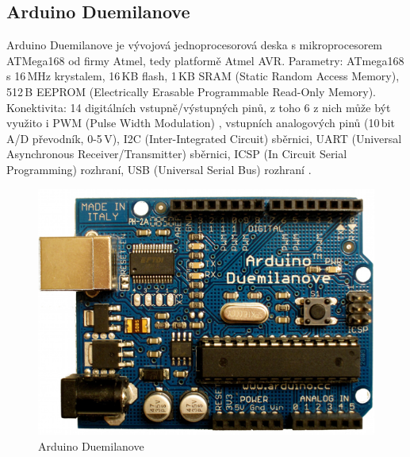 		\subsection{Arduino Duemilanove} Arduino Duemilanove je vývojová jednoprocesorová deska s mikroprocesorem ATMega168 od firmy Atmel, tedy platformě Atmel AVR. 
		Parametry: ATmega168 s 16\,MHz krystalem, 16\,KB flash, 1\,KB SRAM (Static Random Access Memory), 512\,B EEPROM (Electrically Erasable Programmable Read-Only Memory). 	Konektivita: 14 digitálních vstupně/výstupných pinů, z toho 6 z nich může být využito i PWM (Pulse Width Modulation) , vstupních analogových pinů (10\,bit A/D převodník, 0-5\,V), I2C (Inter-Integrated Circuit) sběrnici, UART (Universal Asynchronous Receiver/Transmitter) sběrnici, ICSP (In Circuit Serial Programming) rozhraní, USB (Universal Serial Bus) rozhraní \cite{ArduinoDuemilanove}.	
			\begin{figure}[!h]
  \begin{center}
    \includegraphics[scale=0.2]{obrazky/emded_arduino_duemilanove}
  \end{center}
  \caption{Arduino Duemilanove \cite{ArduinoDuemilanove}}
\end{figure}
	
	
